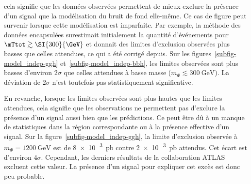 cela signifie que les données observées permettent de mieux exclure la présence d'un signal
que la modélisation du bruit de fond elle-même.
Ce cas de figure peut survenir lorsque cette modélisation est imparfaite.
Par exemple, la méthode des données encapsulées surestimait initialement la quantité d'événements
pour $\mTtot \gtrsim \SI{300}{\GeV}$ \cite{Gael_thesis} et donnait des limites d'exclusion observées plus basses que celles attendues, ce qui a été corrigé depuis.
Sur les figures~\ref{subfig-model_indep-ggh} et~\ref{subfig-model_indep-bbh},
les limites observées sont plus basses d'environ $2\sigma$ que celles attendues à basse masse ($m_\Phi \lesssim \SI{300}{\GeV}$).
La déviation de $2\sigma$ n'est toutefois pas statistiquement significative.
\par
En revanche, lorsque les limites observées sont plus hautes que les limites attendues,
cela signifie que les observations ne permettent pas d'exclure la présence d'un signal
aussi bien que les prédictions.
Ce peut être dû à un manque de statistiques dans la région correspondante
ou
à la présence effective d'un signal.
Sur la figure~\ref{subfig-model_indep-ggh},
la limite d'exclusion observée à $m_{\Phi}=\SI{1200}{\GeV}$ est de
\SI{8e-3}{\pico\barn}
contre
\SI{2e-3}{\pico\barn} attendus.
Cet écart est d'environ $4\sigma$.
Cependant, les derniers résultats de la collaboration ATLAS~\cite{ATLAS-MSSM-HTT_2020} excluent cette valeur.
La présence d'un signal pour expliquer cet excès est donc peu probable.
